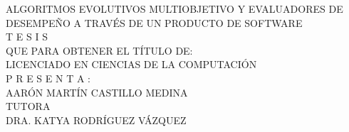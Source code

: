 \documentclass[class=report, crop=false]{standalone}
\begin{document}
\begin{minipage}[c][9.7cm][s]{9.9cm}
{              %
              \uppercase{\large{A}\normalsize{lgoritmos} \large{E}\normalsize{volutivos} \large{M}\normalsize{ultiobjetivo y} \large{E}\normalsize{valuadores de} \large{D}\normalsize{esempeño a} \large{T}\normalsize{ravés de un} \large{P}\normalsize{roducto de} \large{S}\normalsize{oftware}}\\[1.8cm]

              \Huge{T \hspace{1cm} E \hspace{1cm} S \hspace{1cm} I \hspace{1cm} S  }\\[1.6cm]
 
              \normalsize{QUE PARA OBTENER EL TÍTULO DE:}\\[1.5cm]

              \normalsize{\uppercase{Licenciado en Ciencias de la Computación}  }\\[1.1cm]

              \normalsize{P \hspace{2ex} R \hspace{2ex} E \hspace{2ex} S \hspace{2ex} E \hspace{2ex} N \hspace{2ex} T \hspace{2ex} A \hspace{2ex} :}\\[1.5cm]

              \normalsize{\uppercase{Aarón Martín Castillo Medina}  }\\[1.4cm]

              \normalsize{TUTORA  }\\[0.27cm]

              \normalsize{\uppercase{Dra. Katya Rodríguez Vázquez}  }\\[1.4cm]

              \normalsize{\the\year}

      }%

\end{minipage}

\end{document}
